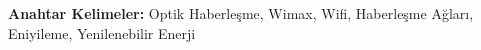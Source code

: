 \begin{comment}


Dağıtık yenilenebilir enerji üretim sistemleri başlığında değerlendirilen rüzgar ve güneş enerji santrallerinin bir arıza durumunda oluşturdukları maliyetleri düşürmek ve üretilen enerjilerin verimlerini arttırmak için gerçek zamanlı olarak takiplerinin yapılması elzem bir durumdur. Yenilenebilir enerji santrallerinde kullanılan haberleşme sistemlerinin standartları \gls{iec} ve \gls{ieee} tarafından belirlenmiştir.
Bu yüksek lisans tezinde ilgili standartlara bağlı kalarak \gls{dpu} bünyesinde dağıtık yenilenebilir enerji sistemleri kurulması durumunda gereken haberleşme ağı tasarımları yapılıp ve maliyetleri analizlenmiştir.


Günümüzde, artan enerji ihtiyaçlarının karşılanması konusunda insanlar dünyaya daha az zarar vererek enerji üretme konusuna ağırlık verdiler. Bu sebeple ülkeler yenilenebilir enerji kaynaklarını, fosil kaynaklara tercih etmeye başlamışlardır.

Yenilenebilir enerji santrallerinin doğası gereği dağıtık yapıda olmasından kaynaklı olarak bakım, onarım ve arıza müdahalelerinden kaynaklı maliyetleri fazladır. Yenilenebilir enerji kaynaklarından elde edilen enerjinin verimi henüz fosil yakıtlardan elde edilen enerji veriminden az olduğundan, enerji üretiminde yatırımsal anlamda maliyetlerin azaltıcı aksiyonların alınması elzemdir. Santraldeki yaşanması muhtemel arızaların önüne geçebilmek için santral içerisindeki donanımların faaliyetlerini gerçek zamanlı izlemek gerekmektedir. Bu sebeple haberleşme sistemlerinin yenilenebilir enerji santrallerindeki önemli büyüktür. 

Tüm sektörlerde olduğu gibi enerji sektöründe de teknolojik gelişmeler yaşan-maktadır. Haberleşme sistemlerindeki teknolojik gelişmelerin enerji sistemlerine uyarlanması sonucunda bakım, onarım ve enerji verimi faaliyetlerinin oluşturacağı maliyetlerin düşürülmesi amaçlanarak bu tez hazırlanmıştır.









\end{comment}





\textbf{Anahtar Kelimeler: } Optik Haberleşme, Wimax, Wifi, Haberleşme Ağları, Eniyileme, Yenilenebilir Enerji 

